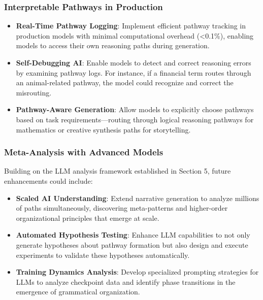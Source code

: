 \subsubsection{Interpretable Pathways in Production}

\begin{itemize}
    \item \textbf{Real-Time Pathway Logging}: Implement efficient pathway tracking in production models with minimal computational overhead (<0.1\%), enabling models to access their own reasoning paths during generation.
    
    \item \textbf{Self-Debugging AI}: Enable models to detect and correct reasoning errors by examining pathway logs. For instance, if a financial term routes through an animal-related pathway, the model could recognize and correct the misrouting.
    
    \item \textbf{Pathway-Aware Generation}: Allow models to explicitly choose pathways based on task requirements—routing through logical reasoning pathways for mathematics or creative synthesis paths for storytelling.
\end{itemize}

\subsubsection{Meta-Analysis with Advanced Models}

Building on the LLM analysis framework established in Section 5, future enhancements could include:

\begin{itemize}
    \item \textbf{Scaled AI Understanding}: Extend narrative generation to analyze millions of paths simultaneously, discovering meta-patterns and higher-order organizational principles that emerge at scale.
    
    \item \textbf{Automated Hypothesis Testing}: Enhance LLM capabilities to not only generate hypotheses about pathway formation but also design and execute experiments to validate these hypotheses automatically.
    
    \item \textbf{Training Dynamics Analysis}: Develop specialized prompting strategies for LLMs to analyze checkpoint data and identify phase transitions in the emergence of grammatical organization.
\end{itemize}

